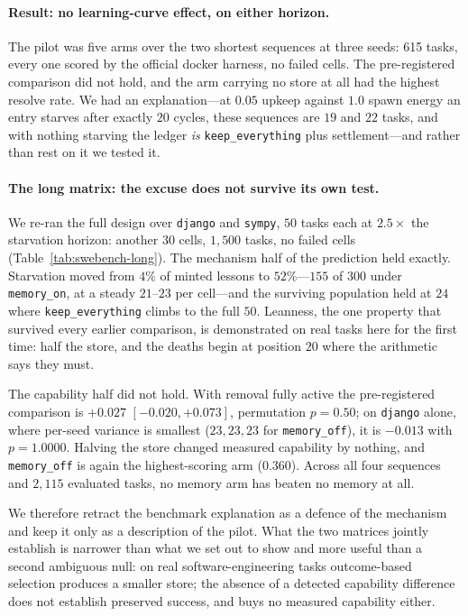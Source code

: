 \paragraph{Result: no learning-curve effect, on either horizon.}
The pilot was five arms over the two shortest sequences at three seeds:
615 tasks, every one scored by the official docker harness, no failed
cells. The pre-registered comparison did not hold, and the arm carrying
no store at all had the highest resolve rate. We had an explanation---at
$0.05$ upkeep against $1.0$ spawn energy an entry starves after exactly
$20$ cycles, these sequences are $19$ and $22$ tasks, and with nothing
starving the ledger \emph{is} \texttt{keep\_everything} plus
settlement---and rather than rest on it we tested it.

\paragraph{The long matrix: the excuse does not survive its own test.}
We re-ran the full design over \texttt{django} and \texttt{sympy}, $50$
tasks each at $2.5\times$ the starvation horizon: another 30 cells,
$1{,}500$ tasks, no failed cells (Table~\ref{tab:swebench-long}). The
mechanism half of the prediction held exactly. Starvation moved from
$4\%$ of minted lessons to $52\%$---$155$ of $300$ under
\texttt{memory\_on}, at a steady $21$--$23$ per cell---and the surviving
population held at $24$ where \texttt{keep\_everything} climbs to the
full $50$. Leanness, the one property that survived every earlier
comparison, is demonstrated on real tasks here for the first time: half
the store, and the deaths begin at position $20$ where the arithmetic
says they must.

The capability half did not hold. With removal fully active the
pre-registered comparison is $+0.027$ $[-0.020, +0.073]$, permutation
$p = 0.50$; on \texttt{django} alone, where per-seed variance is
smallest ($23,23,23$ for \texttt{memory\_off}), it is $-0.013$ with
$p = 1.0000$. Halving the store changed measured capability by nothing,
and \texttt{memory\_off} is again the highest-scoring arm ($0.360$).
Across all four sequences and $2{,}115$ evaluated tasks, no memory arm
has beaten no memory at all.

We therefore retract the benchmark explanation as a defence of the
mechanism and keep it only as a description of the pilot. What the two
matrices jointly establish is narrower than what we set out to show and
more useful than a second ambiguous null: on real software-engineering
tasks outcome-based selection produces a smaller store; the absence of a
detected capability difference does not establish preserved success, and buys no measured capability either.



